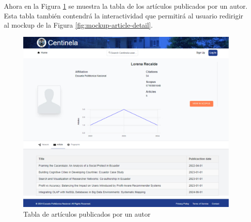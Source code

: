 Ahora en la Figura \ref{fig:articles-table} se muestra la tabla de los artículos publicados por un autor. Esta tabla también contendrá la interactividad que permitirá al usuario redirigir al mockup de la Figura \ref{fig:mockup-article-detail}.
\begin{figure}[H]
    \centering
    \includegraphics[scale=0.5]{../02Figures/02Chapter/Sprints/Sprint-2/article-table.png}
    \caption{Tabla de artículos publicados por un autor}
    \label{fig:articles-table}
\end{figure}


%

